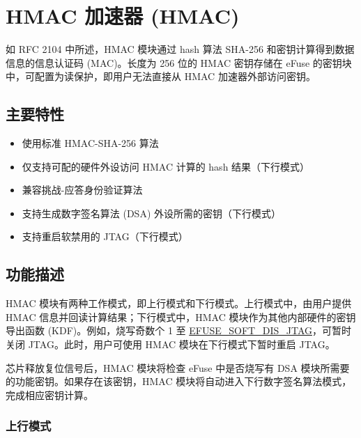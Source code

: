 \documentclass[main\_\_CN.tex]{subfiles}
\begin{document}

\ifglobal
\else
    {\let\clearpage\relax \listoftodos}
    \tableofcontents
\fi




\chapter{HMAC 加速器 (HMAC)}
\label{mod:hmac}
\hypertarget{hmac}{}

如 RFC 2104 中所述，HMAC 模块通过 hash 算法 SHA-256 和密钥计算得到数据信息的信息认证码 (MAC)。长度为 256 位的 HMAC 密钥存储在 eFuse 的密钥块中，可配置为读保护，即用户无法直接从 HMAC 加速器外部访问密钥。

\section{主要特性}
\begin{itemize}
    \item 使用标准 HMAC-SHA-256 算法
    \item 仅支持可配的硬件外设访问 HMAC 计算的 hash 结果（下行模式）
    \item 兼容挑战-应答身份验证算法
    \item 支持生成数字签名算法 (DSA) 外设所需的密钥（下行模式）
    \item 支持重启软禁用的 JTAG（下行模式）
\end{itemize}


\section{功能描述}
HMAC 模块有两种工作模式，即上行模式和下行模式。上行模式中，由用户提供 HMAC 信息并回读计算结果；下行模式中，HMAC 模块作为其他内部硬件的密钥导出函数 (KDF)。例如，烧写奇数个 1 至 \hyperref[fielddesc:EFUSESOFTDISJTAG]{EFUSE\_SOFT\_DIS\_JTAG}，可暂时关闭 JTAG。此时，用户可使用 HMAC 模块在下行模式下暂时重启 JTAG。

芯片释放复位信号后，HMAC 模块将检查 eFuse 中是否烧写有 DSA 模块所需要的功能密钥。如果存在该密钥，HMAC 模块将自动进入下行数字签名算法模式，完成相应密钥计算。

\subsection{上行模式}
\end{document}
